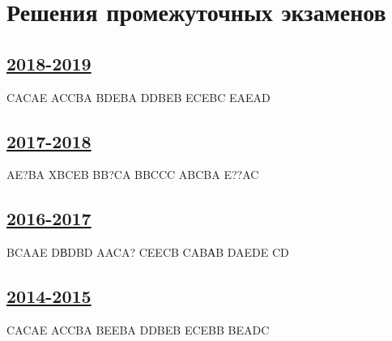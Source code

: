 \thispagestyle{empty}
\section{Решения промежуточных экзаменов}

\subsection[2018-2019]{\hyperref[sec:midterm_exam_2018_2019]{2018-2019}}
\label{sec:sol_midterm_exam_2018_2019}

CACAE ACCBA BDEBA DDBEB ECEBC EAEAD

\subsection[2017-2018]{\hyperref[sec:midterm_exam_2017_2018]{2017-2018}}
\label{sec:sol_midterm_exam_2017_2018}

AE?BA XBCEB BB?CA BBCCC ABCBA E??AC

\subsection[2016-2017]{\hyperref[sec:midterm_exam_2016_2017]{2016-2017}}
\label{sec:sol_midterm_exam_2016_2017}

BCAAE DВDBD AACA? CEECB CABАB DAEDE CD

\subsection[2014-2015]{\hyperref[sec:midterm_exam_2014_2015]{2014-2015}}
\label{sec:sol_midterm_exam_2014_2015}

CACAE ACCBA BEEBA DDBEB ECEBB BEADC